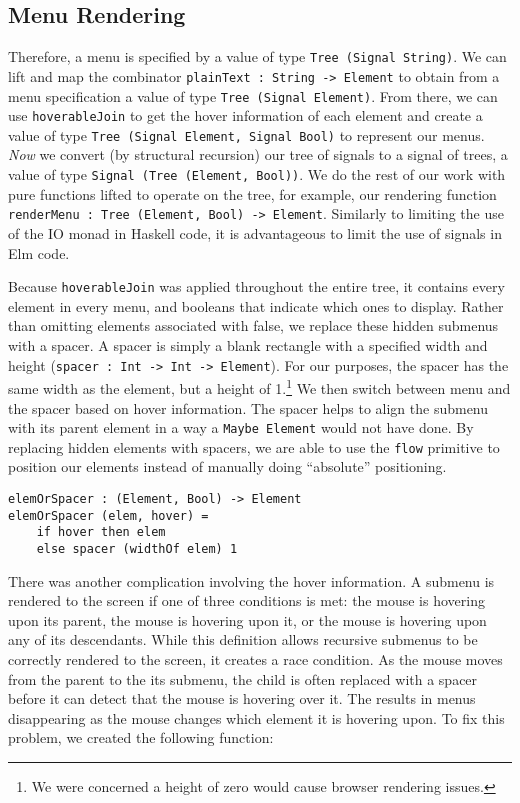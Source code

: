 \documentclass{article}
\begin{document}
\subsection{Menu Rendering}

Therefore, a menu is specified by a value of type \texttt{Tree (Signal String)}.
We can lift and map the combinator \texttt{plainText : String -> Element} to
obtain from a menu specification a value of type \texttt{Tree (Signal Element)}.
From there, we can use \texttt{hoverableJoin} to get the hover information of
each element and create a value of type \texttt{Tree (Signal Element, Signal
Bool)} to represent our menus. \emph{Now} we convert (by structural recursion)
our tree of signals to a signal of trees, a value of type \texttt{Signal (Tree
(Element, Bool))}. We do the rest of our work with pure functions lifted to
operate on the tree, for example, our rendering function \texttt{renderMenu :
    Tree (Element, Bool) -> Element}. Similarly to limiting the use
    of the IO monad in Haskell code, it is advantageous to limit the use of
    signals in Elm code.

Because \texttt{hoverableJoin} was applied throughout the entire tree, it
contains every element in every menu, and booleans that indicate which ones to
display. Rather than omitting elements associated with false, we replace these
hidden submenus with a spacer. A spacer is simply a blank rectangle with a
specified width and height (\texttt{spacer : Int -> Int
-> Element}). For our purposes, the spacer has the same width as
the element, but a height of 1.\footnote{We were concerned a height of zero
would cause browser rendering issues.} We then switch between menu and the
spacer based on hover information. The spacer helps to align the submenu with
its parent element in a way a \texttt{Maybe Element} would not have done. By
replacing hidden elements with spacers, we are able to use the \texttt{flow}
primitive to position our elements instead of manually doing ``absolute''
positioning.

\begin{verbatim}
elemOrSpacer : (Element, Bool) -> Element
elemOrSpacer (elem, hover) =
    if hover then elem
    else spacer (widthOf elem) 1
\end{verbatim}

There was another complication involving the hover information. A submenu is
rendered to the screen if one of three conditions is met: the mouse is hovering
upon its parent, the mouse is hovering upon it, or the mouse is hovering upon
any of its descendants. While this definition allows recursive submenus to be
correctly rendered to the screen, it creates a race condition. As the mouse
moves from the parent to the its submenu, the child is often replaced with a
spacer before it can detect that the mouse is hovering over it. The results in
menus disappearing as the mouse changes which element it is hovering upon. To
fix this problem, we created the following function:
\end{document}
